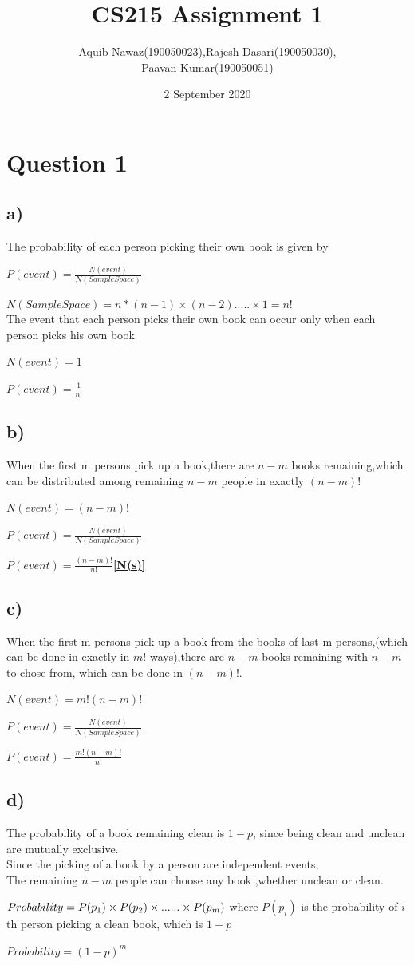 \documentclass{article}
\title{CS215 Assignment 1}
\author{Aquib Nawaz(190050023),Rajesh Dasari(190050030),\\Paavan Kumar(190050051)}
\date{2 September 2020}
\begin{document}
\maketitle

\section* {Question 1}
\subsection* {a)}
    The probability of each person picking their own book is given by \\
    \par
    $P(event)=\frac{N(event)}{N(SampleSpace)}$
    \par
    $N(SampleSpace)=n* (n-1)\times (n-2) ..... \times 1 = n!$\\\label{N(s)}
    The event that each person picks their own book can occur only when each person picks his own book
    \par
    $N(event)=1$
    \par
    \textbf{$P(event)=\frac{1}{n!}$}
\subsection* {b)}
    When the first m persons pick up a book,there are $n-m$ books remaining,which can be distributed among remaining $n-m$ people in exactly $(n-m)!$
    \par
    $N(event)=(n-m)!$
    \par
    $P(event)=\frac{N(event)}{N(SampleSpace)}$
    \par
    \textbf{$P(event)=\frac{(n-m)!}{n!}$\ref{N(s)}}
\subsection* {c)}
     When the first m persons pick up a book from the books of last m persons,(which can be done in exactly in $m!$ ways),there are $n-m$ books remaining with $n-m$ to chose from, which can be done in $(n-m)!$.
     \par
     $N(event)=m!(n-m)!$
     \par
     $P(event)=\frac{N(event)}{N(SampleSpace)}$
     \par
     \textbf{$P(event)=\frac{m!(n-m)!}{n!}$}
\subsection* {d)}
    The probability of a book remaining clean is $1-p$, since being clean and unclean are mutually exclusive.\\
    Since the picking of a book by a person are independent events,\\
    The remaining $n-m$ people can choose any book ,whether unclean or clean.
    \par
    $Probability=P(p_1)\times P(p_2)\times ......\times P(p_{m})\\$
    where $P(p_{i})$ is the probability of $i$th person picking a clean book, which is $1-p$
    \par
    $Probability=(1-p)^m$
\end{document}
